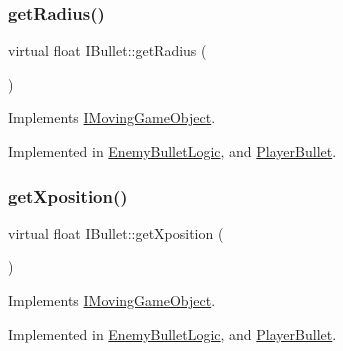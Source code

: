 \mbox{\label{class_i_bullet_a327968e71126cdea5998076d8919354f}} 
\subsubsection{\texorpdfstring{get\+Radius()}{getRadius()}}
{\footnotesize\ttfamily virtual float I\+Bullet\+::get\+Radius (\begin{DoxyParamCaption}{ }\end{DoxyParamCaption})\hspace{0.3cm}{\ttfamily [pure virtual]}}



Implements \hyperlink{class_i_moving_game_object_ab2120f126d088beda46654aa3ccfd705}{I\+Moving\+Game\+Object}.



Implemented in \hyperlink{class_enemy_bullet_logic_a7e473b13bf07fdf8eb76b65e02879bf7}{Enemy\+Bullet\+Logic}, and \hyperlink{class_player_bullet_a1ff56e38b1447500d2887b6fe1eeb674}{Player\+Bullet}.

\mbox{\label{class_i_bullet_a20babdd6c657ddda175e84a56564dcfa}} 
\subsubsection{\texorpdfstring{get\+Xposition()}{getXposition()}}
{\footnotesize\ttfamily virtual float I\+Bullet\+::get\+Xposition (\begin{DoxyParamCaption}{ }\end{DoxyParamCaption})\hspace{0.3cm}{\ttfamily [pure virtual]}}



Implements \hyperlink{class_i_moving_game_object_acc7f0195491b1843558c8c558cbc7363}{I\+Moving\+Game\+Object}.



Implemented in \hyperlink{class_enemy_bullet_logic_afe73016d27c33171a20c15e11026106e}{Enemy\+Bullet\+Logic}, and \hyperlink{class_player_bullet_aa9462c44892190316ee479a18693b6ad}{Player\+Bullet}.

\mbox{\label{class_i_bullet_a36594de9a0c0ddd7083bca10ef5d8332}} 
